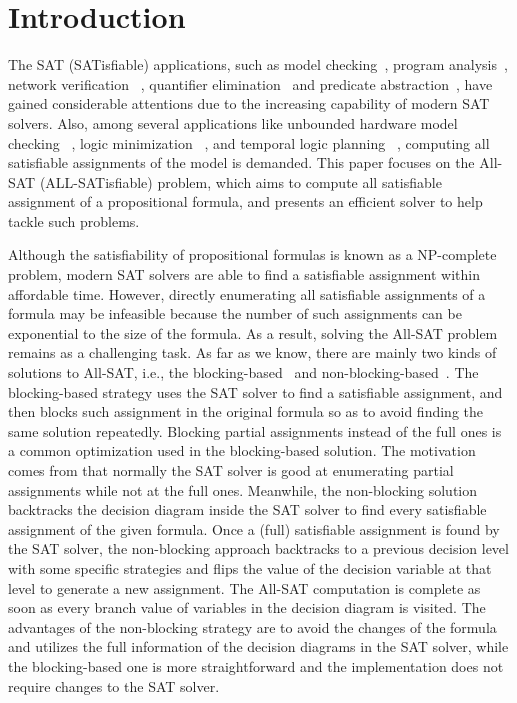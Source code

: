\section{Introduction}
The SAT (SATisfiable) applications, such as model checking~\cite{bmc,ic3}, program analysis~\cite{klee,cpachecker,cbmc}, network verification ~\cite{lopes2015checking,majumdar2014kuai,zhang2012verification}, quantifier elimination~\cite{brauer2011existential} and predicate abstraction~\cite{lahiri2003symbolic}, have gained considerable attentions due to the increasing capability of modern SAT solvers. 
Also, among several applications like unbounded hardware model checking ~\cite{car}, logic minimization ~\cite{sapra2003sat}, and temporal logic planning ~\cite{aalta}, computing all satisfiable assignments of the model is demanded. This paper focuses on the All-SAT (ALL-SATisfiable) problem, which aims to compute all satisfiable assignment of a propositional formula, and presents an efficient solver \tool to help tackle such problems.

Although the satisfiability of propositional formulas is known as a NP-complete problem, modern SAT solvers are able to find a satisfiable assignment within affordable time. However, directly enumerating all satisfiable assignments of a formula may be infeasible because the number of such assignments can be exponential to the size of the formula. As a result, solving the All-SAT problem remains as a challenging task. As far as we know, there are mainly two kinds of solutions to All-SAT, i.e., the blocking-based~\cite{mcmillan2002applying} and non-blocking-based~\cite{grumberg2004memory}. The blocking-based strategy uses the SAT solver to find a satisfiable assignment, and then blocks such assignment in the original formula so as to avoid finding the same solution repeatedly. Blocking partial assignments instead of the full ones is a common optimization used in the blocking-based solution. The motivation comes from that normally the SAT solver is good at enumerating partial assignments while not at the full ones. 
Meanwhile, the non-blocking solution backtracks the decision diagram inside the SAT solver to find every satisfiable assignment of the given formula. Once a (full) satisfiable assignment is found by the SAT solver, the non-blocking approach backtracks to a previous decision level with some specific strategies and flips the value of the decision variable at that level to generate a new assignment. The All-SAT computation is complete as soon as every branch value of variables in the decision diagram is visited. 
The advantages of the non-blocking strategy are to avoid the changes of the formula and utilizes the full information of the decision diagrams in the SAT solver, while the blocking-based one is more straightforward and the implementation does not require changes to the SAT solver.

